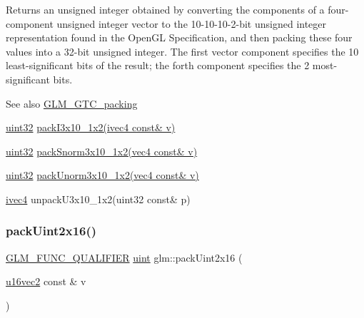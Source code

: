 Returns an unsigned integer obtained by converting the components of a four-\/component unsigned integer vector to the 10-\/10-\/10-\/2-\/bit unsigned integer representation found in the Open\+GL Specification, and then packing these four values into a 32-\/bit unsigned integer. The first vector component specifies the 10 least-\/significant bits of the result; the forth component specifies the 2 most-\/significant bits.

\begin{DoxySeeAlso}{See also}
\hyperlink{group__gtc__packing}{G\+L\+M\+\_\+\+G\+T\+C\+\_\+packing} 

\hyperlink{group__gtc__type__precision_ga202b6a53c105fcb7e531f9b443518451}{uint32} \hyperlink{group__gtc__packing_ga032e18fa5bc5b8f3897104aeb2f1e195}{pack\+I3x10\+\_\+1x2(ivec4 const\& v)} 

\hyperlink{group__gtc__type__precision_ga202b6a53c105fcb7e531f9b443518451}{uint32} \hyperlink{group__gtc__packing_ga0d4157cec37c0312216a7be1cc92df54}{pack\+Snorm3x10\+\_\+1x2(vec4 const\& v)} 

\hyperlink{group__gtc__type__precision_ga202b6a53c105fcb7e531f9b443518451}{uint32} \hyperlink{group__gtc__packing_ga2cf2d11b40bd48639110456fd74c2e33}{pack\+Unorm3x10\+\_\+1x2(vec4 const\& v)} 

\hyperlink{group__core__types_gaa4560ddc50320ea8f8a70d5c9c249fea}{ivec4} unpack\+U3x10\+\_\+1x2(uint32 const\& p) 
\end{DoxySeeAlso}
\mbox{\label{group__gtc__packing_gad5ca2e64edae3c233657c9fb0d18a9c9}} 
\subsubsection{\texorpdfstring{pack\+Uint2x16()}{packUint2x16()}}
{\footnotesize\ttfamily \hyperlink{setup_8hpp_a33fdea6f91c5f834105f7415e2a64407}{G\+L\+M\+\_\+\+F\+U\+N\+C\+\_\+\+Q\+U\+A\+L\+I\+F\+I\+ER} \hyperlink{group__core__precision_ga4fd29415871152bfb5abd588334147c8}{uint} glm\+::pack\+Uint2x16 (\begin{DoxyParamCaption}\item[{\hyperlink{group__gtc__type__precision_ga50bd2ceeb100a187e7c46f135269a0ec}{u16vec2} const \&}]{v }\end{DoxyParamCaption})}

